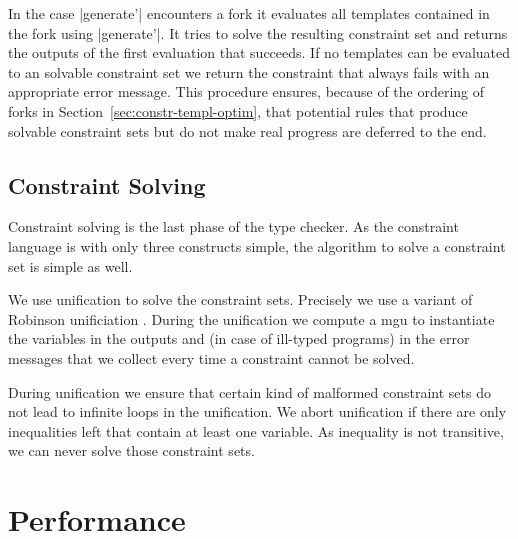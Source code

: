 In the case \code|generate'| encounters a fork it evaluates all
templates contained in the fork using \code|generate'|. It tries to
solve the resulting constraint set and returns the outputs of the
first evaluation that succeeds. If no templates can be evaluated to an
solvable constraint set we return the constraint that always fails
with an appropriate error message. This procedure ensures, because of
the ordering of forks in Section~\ref{sec:constr-templ-optim}, that
potential rules that produce solvable constraint sets but do not make
real progress are deferred to the end.

\subsection{Constraint Solving}
\label{sec:constraint-solving}
Constraint solving is the last phase of the type checker. As the
constraint language is with only three constructs simple, the
algorithm to solve a constraint set is simple as well.

We use unification to solve the constraint sets. Precisely we use a
variant of Robinson unificiation . During the
unification we compute a \gls{mgu} to instantiate the variables in the
outputs and (in case of ill-typed programs) in the error messages that
we collect every time a constraint cannot be solved.

During unification we ensure that certain kind of malformed constraint
sets do not lead to infinite loops in the unification. We abort
unification if there are only inequalities left that contain at least
one variable. As inequality is not transitive, we can never solve
those constraint sets.
\section{Performance}
\label{sec:performance}


